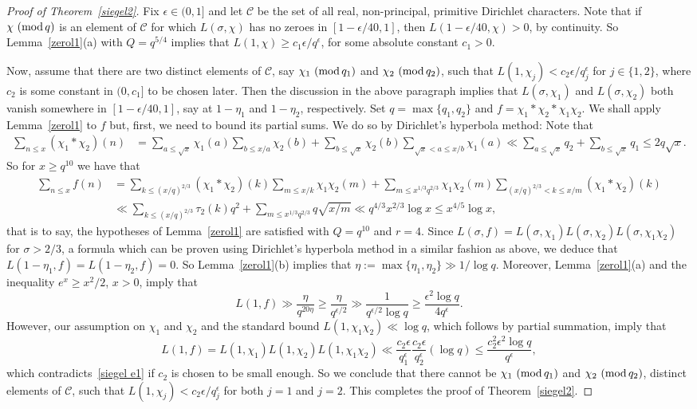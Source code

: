 \documentclass[12pt]{amsart}
\theoremstyle{remark}
\newcommand{\bsp}{\begin{split}}
\newcommand{\be}{\begin{equation}}
\newcommand{\ee}{\end{equation}}
\newcommand{\bes}{\begin{equation*}}
\newcommand{\ees}{\end{equation*}}
\numberwithin{equation}{section}
\renewcommand{\pmod}[1]{~({\rm mod}\,#1)}
\begin{document}
\begin{proof}[Proof of Theorem~\ref{siegel2}] Fix $\epsilon\in(0,1]$ and let $\mathscr{C}$ be the set of all real, non-principal, primitive Dirichlet characters. Note that if $\chi\pmod q$ is an element of $\mathscr{C}$ for which $L(\sigma,\chi)$ has no zeroes in $[1-\epsilon/40,1]$, then $L(1-\epsilon/40,\chi)>0$, by continuity. So Lemma~\ref{zerol1}(a) with $Q=q^{5/4}$ implies that $L(1,\chi)\ge c_1\epsilon /q^{\epsilon}$, for some absolute constant $c_1>0$.

Now, assume that there are two distinct elements of $\mathscr{C}$, say $\chi_1\pmod{q_1}$ and $\chi_2\pmod{q_2}$, such that $L(1,\chi_j)<c_2\epsilon/q_j^\epsilon$ for $j\in\{1,2\}$, where $c_2$ is some constant in $(0,c_1]$ to be chosen later. Then the discussion in the above paragraph implies that $L(\sigma,\chi_1)$ and $L(\sigma,\chi_2)$ both vanish somewhere in $[1-\epsilon/40,1]$, say at $1-\eta_1$ and $1-\eta_2$, respectively. Set $q=\max\{q_1,q_2\}$ and $f=\chi_1*\chi_2*\chi_1\chi_2$. We shall apply Lemma~\ref{zerol1} to $f$ but, first, we need to bound its partial sums. We do so by Dirichlet's hyperbola method: Note that
\bes\bsp
\sum_{n\le x}(\chi_1*\chi_2)(n) &= \sum_{a\le\sqrt{x}}\chi_1(a)\sum_{b\le x/a}\chi_2(b)+\sum_{b\le\sqrt{x}}\chi_2(b)\sum_{\sqrt{x}<a\le x/b}\chi_1(a)
\ll \sum_{a\le\sqrt{x}}q_2+\sum_{b\le\sqrt{x}}q_1 \le2q\sqrt{x}.
\end{split}\ees
So for $x\ge q^{10}$ we have that
\bes\bsp
\sum_{n\le x}f(n) & = \sum_{k\le (x/q)^{2/3} } (\chi_1*\chi_2)(k) \sum_{m\le x/k}\chi_1\chi_2(m) + \sum_{m\le x^{1/3}q^{2/3}}\chi_1\chi_2(m)\sum_{(x/q)^{2/3}<k\le x/m}(\chi_1*\chi_2)(k) \\
&\ll \sum_{k\le (x/q)^{2/3}}\tau_2(k)q^2 + \sum_{m \le x^{1/3}q^{2/3}} q\sqrt{x/m} \ll q^{4/3}x^{2/3}\log x\le x^{4/5}\log x,
\end{split}\ees
that is to say, the hypotheses of Lemma~\ref{zerol1} are satisfied with $Q=q^{10}$ and $r=4$. Since $L(\sigma,f)=L(\sigma,\chi_1)L(\sigma,\chi_2)L(\sigma,\chi_1\chi_2)$ for $\sigma>2/3$, a formula which can be proven using Dirichlet's hyperbola method in a similar fashion as above, we deduce that $L(1-\eta_1,f)=L(1-\eta_2,f)=0$. So Lemma~\ref{zerol1}(b) implies that $\eta:=\max\{\eta_1,\eta_2\}\gg1/\log q$. Moreover, Lemma~\ref{zerol1}(a) and the inequality $e^x\ge x^2/2$, $x>0$, imply that
\be\label{siegel e1}
L(1,f)\gg\frac{\eta}{q^{20\eta}}\ge\frac{\eta}{q^{\epsilon/2}}\gg\frac1{q^{\epsilon/2}\log q}\ge\frac{\epsilon^2\log q}{4q^{\epsilon}}.
\ee
However, our assumption on $\chi_1$ and $\chi_2$ and the standard bound $L(1,\chi_1\chi_2)\ll\log q$,
which follows by partial summation, imply that
$$
L(1,f)=L(1,\chi_1)L(1,\chi_2)L(1,\chi_1\chi_2)\ll \frac{c_2\epsilon}{q_1^\epsilon}\frac{c_2\epsilon}{q_2^\epsilon}(\log q)\le\frac{c_2^2\epsilon^2\log q}{q^\epsilon},
$$
which contradicts~\eqref{siegel e1} if $c_2$ is chosen to be small enough. So we conclude that there cannot be $\chi_1\pmod{q_1}$ and $\chi_2\pmod{q_2}$, distinct elements of $\mathscr{C}$, such that $L(1,\chi_j)<c_2\epsilon/q_j^\epsilon$ for both $j=1$ and $j=2$. This completes the proof of Theorem~\ref{siegel2}.
\end{proof}
\end{document}
